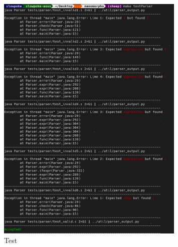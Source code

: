 \documentclass{homework}
\begin{document}
\begin{answer}
  \begin{figure}[h]
    \centering
    \caption*{Test}
    \includegraphics[width=0.8\textwidth]{testParser.png}
  \end{figure}
\end{answer}
\end{document}
